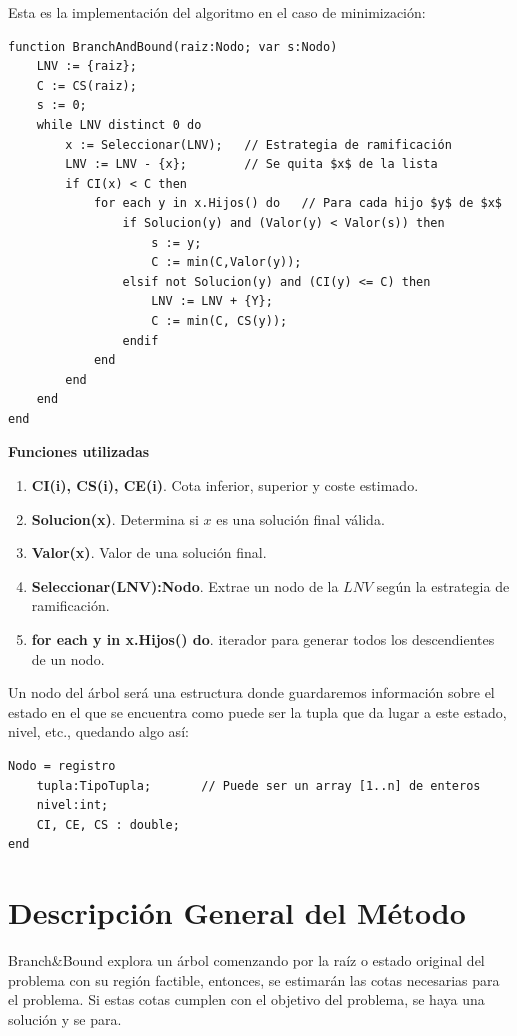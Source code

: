 \documentclass[10pt,a4paper,spanish]{report}
\theoremstyle{definition}
\theoremstyle{remark}
\begin{document}
Esta es la implementación del algoritmo en el caso de minimización:
\begin{verbatim}
function BranchAndBound(raiz:Nodo; var s:Nodo)
    LNV := {raiz};
    C := CS(raiz);
    s := 0;
    while LNV distinct 0 do
        x := Seleccionar(LNV);   // Estrategia de ramificación
        LNV := LNV - {x};        // Se quita $x$ de la lista
        if CI(x) < C then
            for each y in x.Hijos() do   // Para cada hijo $y$ de $x$
                if Solucion(y) and (Valor(y) < Valor(s)) then
                    s := y;
                    C := min(C,Valor(y));
                elsif not Solucion(y) and (CI(y) <= C) then
                    LNV := LNV + {Y};
                    C := min(C, CS(y));
                endif
            end
        end
    end
end
\end{verbatim}

\textbf{\textcolor{coquelicot}Funciones utilizadas}
\begin{enumerate}[---]
    \item \textbf{CI(i), CS(i), CE(i)}. Cota inferior, superior y coste estimado.
    \item \textbf{Solucion(x)}. Determina si $x$ es una solución final válida.
    \item \textbf{Valor(x)}. Valor de una solución final.
    \item \textbf{Seleccionar(LNV):Nodo}. Extrae un nodo de la $LNV$ según la estrategia de ramificación.
    \item \textbf{for each y in x.Hijos() do}. iterador para generar todos los descendientes de un nodo.
\end{enumerate}

Un nodo del árbol será una estructura donde guardaremos información sobre el estado en el que se encuentra como puede ser la tupla que da lugar a este estado, nivel, etc., quedando algo así:

\begin{verbatim}
Nodo = registro
    tupla:TipoTupla;       // Puede ser un array [1..n] de enteros
    nivel:int;
    CI, CE, CS : double;
end
\end{verbatim}

\section{\textcolor{coquelicot}Descripción General del Método}

Branch\&Bound explora un árbol comenzando por la raíz o estado original del problema con su región factible, entonces, se estimarán las cotas necesarias para el problema. Si estas cotas cumplen con el objetivo del problema, se haya una solución y se para.
\end{document}
